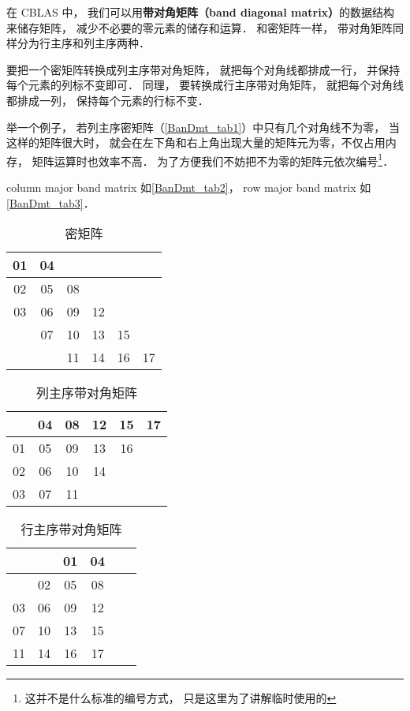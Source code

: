 

在 CBLAS 中， 我们可以用\textbf{带对角矩阵（band diagonal matrix）}的数据结构来储存矩阵， 减少不必要的零元素的储存和运算． 和密矩阵一样， 带对角矩阵同样分为行主序和列主序两种．

要把一个密矩阵转换成列主序带对角矩阵， 就把每个对角线都排成一行， 并保持每个元素的列标不变即可． 同理， 要转换成行主序带对角矩阵， 就把每个对角线都排成一列， 保持每个元素的行标不变．

举一个例子， 若列主序密矩阵（\autoref{BanDmt_tab1}）中只有几个对角线不为零， 当这样的矩阵很大时， 就会在左下角和右上角出现大量的矩阵元为零，不仅占用内存， 矩阵运算时也效率不高． 为了方便我们不妨把不为零的矩阵元依次编号\footnote{这并不是什么标准的编号方式， 只是这里为了讲解临时使用的}．

column major band matrix 如\autoref{BanDmt_tab2}， row major band matrix 如\autoref{BanDmt_tab3}．

\begin{table}[ht]
\centering
\caption{密矩阵}\label{BanDmt_tab1}
\begin{tabular}{|c|c|c|c|c|c|}
\hline
01  & 04  &    &    &    &   \\
\hline
02  & 05  & 08  &    &    &   \\
\hline
03  & 06  & 09  & 12  &    &   \\
\hline
   & 07  & 10 &  13  & 15  &   \\
\hline
   &    & 11 &  14  & 16  & 17 \\
\hline
\end{tabular}
\end{table}

\begin{table}[ht]
\centering
\caption{列主序带对角矩阵}\label{BanDmt_tab2}
\begin{tabular}{|c|c|c|c|c|c|}
\hline
   & 04  & 08  & 12 &  15 &  17 \\
\hline
01  & 05  & 09  & 13 &  16 &    \\
\hline
02  & 06  & 10 & 14 &     &    \\
\hline
03  & 07  & 11 &    &     &    \\
\hline
\end{tabular}
\end{table}

\begin{table}[ht]
\centering
\caption{行主序带对角矩阵}\label{BanDmt_tab3}
\begin{tabular}{|c|c|c|c|c|c|}
\hline
   &     &  01  &  04 \\
\hline
   &  02  &  05  &  08 \\
\hline
03  &  06  &  09  &  12 \\
\hline
07  &  10 &  13 &  15 \\
\hline
11 &  14 &  16 &  17 \\
\hline
\end{tabular}
\end{table}


